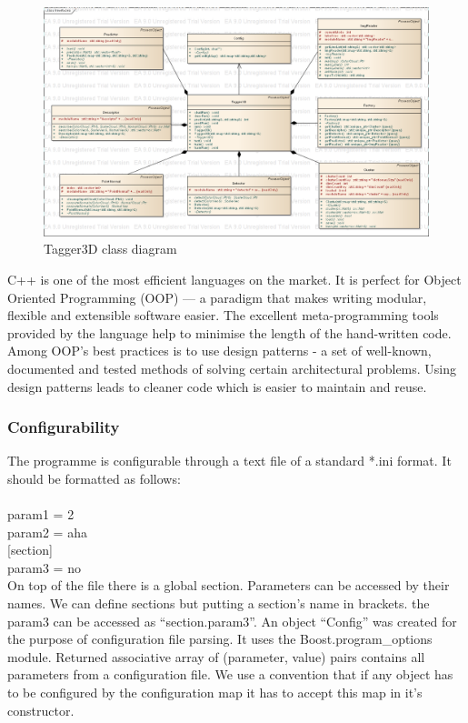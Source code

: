 	\begin{figure}[ht]
	\centering
	\includegraphics[width=1.0\textwidth]{figs/class}
	\caption{Tagger3D class diagram}
	\label{fig:class_diagram}
	\end{figure}
	
	C++ is one of the most efficient languages on the market. It is perfect for Object Oriented Programming (OOP) --- a paradigm that makes writing modular, flexible and extensible software easier. The excellent meta-programming tools provided by the language help to minimise the length of the hand-written code. Among OOP's best practices is to use design patterns - a set of well-known, documented and tested methods of solving certain architectural problems. Using design patterns leads to cleaner code which is easier to maintain and reuse. 
	
	\subsubsection{Configurability}
	The programme is configurable through a text file of a standard *.ini format. It should be formatted as follows:\\ \ \\
	 param1 = 2\\
	 param2 = aha\\
	 {[section]}\\
	 param3 = no\\
	
	On top of the file there is a global section. Parameters can be accessed by their names. We can define sections but putting a section's name in brackets. the param3 can be accessed as ``section.param3''. An object ``Config'' was created for the purpose of configuration file parsing. It uses the Boost.program\_options module. Returned associative array of (parameter, value) pairs contains all parameters from a configuration file. We use a convention that if any object has to be configured by the configuration map it has to accept this map in it's constructor.
	
